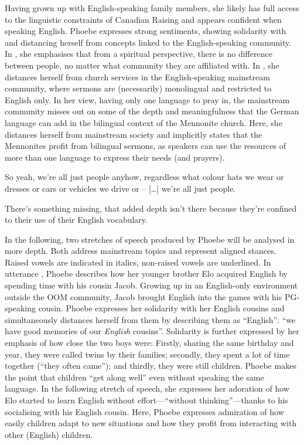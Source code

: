 \documentclass[output=paper]{langscibook}
\begin{document}
Having grown up with English-speaking family members, she likely has full access to the linguistic constraints of Canadian Raising and appears confident when speaking English. Phoebe expresses strong sentiments, showing solidarity with and distancing herself from concepts linked to the English-speaking community. In , she emphasises that from a spiritual perspective, there is no difference between people, no matter what community they are affiliated with. In , she distances herself from church services in the English-speaking mainstream community, where sermons are (necessarily) monolingual and restricted to English only. In her view, having only one language to pray in, the mainstream community misses out on some of the depth and meaningfulness that the German language can add in the bilingual context of the Mennonite church. Here, she distances herself from mainstream society and implicitly states that the Mennonites profit from bilingual sermons, as speakers can use the resources of more than one language to express their needs (and prayers).

\begin{exe}
    \ex\label{neuhausen:ex:9} So yeah, we’re all just people anyhow, regardless what colour hats we wear or dresses or cars or vehicles we drive or – […] we’re all just people.

    \ex\label{neuhausen:ex:10} There’s something missing, that added depth isn’t there because they’re confined to their use of their English vocabulary.
\end{exe}


In the following, two stretches of speech produced by Phoebe will be analysed in more depth. Both address mainstream topics and represent aligned stances. Raised vowels are indicated in italics, non-raised vowels are underlined. In utterance , Phoebe describes how her younger brother Elo acquired English by spending time with his cousin Jacob. Growing up in an English-only environment outside the \gls*{OOM} community, Jacob brought English into the games with his \gls*{PG}-speaking cousin. Phoebe expresses her solidarity with her English cousins and simultaneously distances herself from them by describing them as “English”: “we have good memories of our \textit{English} cousins”. Solidarity is further expressed by her emphasis of how close the two boys were: Firstly, sharing the same birthday and year, they were called twins by their families; secondly, they spent a lot of time together (“they often came”); and thirdly, they were still children. Phoebe makes the point that children “get along well” even without speaking the same language. In the following stretch of speech, she expresses her adoration of how Elo started to learn English without effort—“without thinking”—thanks to his socialising with his English cousin. Here, Phoebe expresses admiration of how easily children adapt to new situations and how they profit from interacting with other (English) children. 
\end{document}
